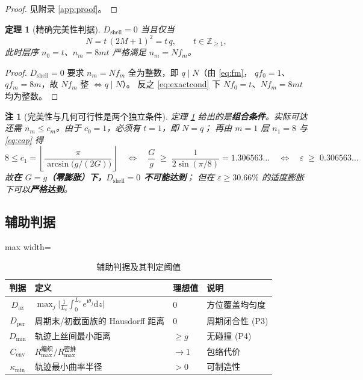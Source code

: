 \documentclass[12pt, a4paper]{ctexart}
\newtheorem{theorem}{定理}[section]
\newtheorem{remark}{注}[section]
\begin{document}
\begin{proof}
见附录 \ref{app:proof}。
\end{proof}

\begin{theorem}[精确完美性判据]
\label{thm:exact}
$D_{\mathrm{shell}} = 0$ 当且仅当
\begin{equation}
N = t\,(2M+1)^2 = t\,q,\qquad t\in\mathbb{Z}_{\ge1},
\label{eq:exactcond}
\end{equation}
此时层序 $n_0=t$、$n_m=8mt$ 严格满足 $n_m = N f_m$。
\end{theorem}

\begin{proof}
$D_{\mathrm{shell}}=0$ 要求 $n_m = Nf_m$ 全为整数，即 $q\mid N$（由 \eqref{eq:fm}，
$q f_0=1$、$q f_m=8m$，故 $Nf_m$ 整 $\iff q\mid N$）。
反之 \eqref{eq:exactcond} 下 $Nf_0 = t$、$Nf_m = 8mt$ 均为整数。
\end{proof}

\begin{remark}[完美性与几何可行性是两个独立条件]
定理 \ref{thm:exact} 给出的是\textbf{组合条件}。实际可达还需
$n_m \le c_m$。由于 $c_0=1$，必须有 $t=1$，即 $N=q$；
再由 $m=1$ 层 $n_1=8$ 与 \eqref{eq:cap} 得
\begin{equation}
8 \le c_1 = \left\lfloor\frac{\pi}{\arcsin\big(g/(2G)\big)}\right\rfloor
\quad\Longleftrightarrow\quad
\frac{G}{g} \;\ge\; \frac{1}{2\sin(\pi/8)} = 1.306563\ldots
\quad\Longleftrightarrow\quad
\varepsilon \;\ge\; 0.306563\ldots
\label{eq:eps_exact}
\end{equation}
故\textbf{在 $G=g$（零膨胀）下，$D_{\mathrm{shell}}=0$ 不可能达到}；
但在 $\varepsilon\ge 30.66\%$ 的适度膨胀下可以\textbf{严格达到}。
\end{remark}

\subsection{辅助判据}

\begin{table}[htbp]
\centering
\caption{辅助判据及其判定阈值}
\label{tab:aux}
\begin{adjustbox}{max width=\textwidth}
\begin{tabular}{clll}
\toprule
判据 & 定义 & 理想值 & 说明 \\
\midrule
$D_{\mathrm{az}}$ & $\displaystyle\max_j\Big|\frac{1}{L_c}\int_0^{L_c}e^{\mathrm{i}\theta_j}\mathrm{d}z\Big|$ & $0$ & 方位覆盖均匀度 \\
$D_{\mathrm{per}}$ & 周期末/初截面族的 Hausdorff 距离 & $0$ & 周期闭合性 (P3) \\
$D_{\min}$ & 轨迹上丝间最小距离 & $\ge g$ & 无碰撞 (P4) \\
$C_{\mathrm{env}}$ & $R_{\max}^{\text{编织}} / R_{\max}^{\text{密排}}$ & $\to 1$ & 包络代价 \\
$\kappa_{\min}$ & 轨迹最小曲率半径 & $>0$ & 可制造性 \\
\bottomrule
\end{tabular}
\end{adjustbox}
\end{table}
\end{document}
